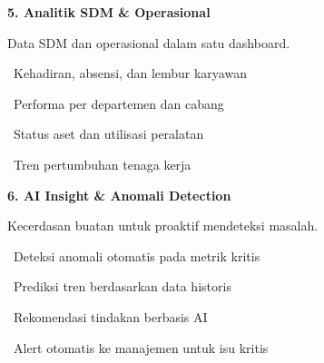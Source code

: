 \documentclass[a4paper]{article}
\begin{document}
\vspace{8pt}

\noindent
\begin{minipage}[t]{0.485\textwidth}
    \colorbox{OrangePrimary}{%
        \begin{minipage}{\dimexpr\textwidth-2\fboxsep\relax}
            {\fontsize{10}{13}\selectfont\bfseries\color{White} 5. Analitik SDM \& Operasional}
        \end{minipage}}\par
    \vspace{4pt}
    {\fontsize{9}{12}\selectfont\color{TextDark}%
    Data SDM dan operasional dalam satu dashboard.\par\vspace{3pt}
    \textbullet\ Kehadiran, absensi, dan lembur karyawan\par\vspace{2pt}%
    \textbullet\ Performa per departemen dan cabang\par\vspace{2pt}%
    \textbullet\ Status aset dan utilisasi peralatan\par\vspace{2pt}%
    \textbullet\ Tren pertumbuhan tenaga kerja}%
\end{minipage}%
\hfill
\begin{minipage}[t]{0.485\textwidth}
    \colorbox{IndigoDark}{%
        \begin{minipage}{\dimexpr\textwidth-2\fboxsep\relax}
            {\fontsize{10}{13}\selectfont\bfseries\color{White} 6. AI Insight \& Anomali Detection}
        \end{minipage}}\par
    \vspace{4pt}
    {\fontsize{9}{12}\selectfont\color{TextDark}%
    Kecerdasan buatan untuk proaktif mendeteksi masalah.\par\vspace{3pt}
    \textbullet\ Deteksi anomali otomatis pada metrik kritis\par\vspace{2pt}%
    \textbullet\ Prediksi tren berdasarkan data historis\par\vspace{2pt}%
    \textbullet\ Rekomendasi tindakan berbasis AI\par\vspace{2pt}%
    \textbullet\ Alert otomatis ke manajemen untuk isu kritis}%
\end{minipage}
\end{document}

